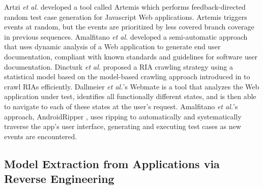 Artzi \textit{et al.} developed a tool called Artemis \cite{artzi2011framework} which performs feedback-directed random test case generation for Javascript Web applications. Artemis triggers events at random, but the events are prioritized by less covered branch coverage in previous sequences.
Amalfitano \textit{et al.} developed a semi-automatic approach \cite{amalfitano2011using} that uses dynamic analysis of a Web application to generate end user documentation, compliant with known standards and guidelines for software user documentation.
Dincturk \textit{et al.} \cite{dincturk2012statistical} proposed a RIA crawling strategy using a statistical model based on the model-based crawling approach introduced in \cite{benjamin2011strategy} to crawl RIAs efficiently.
Dallmeier \textit{et al.}'s Webmate \cite{dallmeier2012Webmate,dallmeier2013Webmate} is a tool that analyzes the Web application under test, identifies all functionally different states, and is then able to navigate to each of these states at the user’s request.
Amalfitano \textit{et al.}'s approach, AndroidRipper \cite{amalfitano2012using}, uses ripping to automatically and systematically traverse the app’s user interface, generating and executing test cases as new events are encountered.

\subsection{Model Extraction from Applications via Reverse Engineering}

